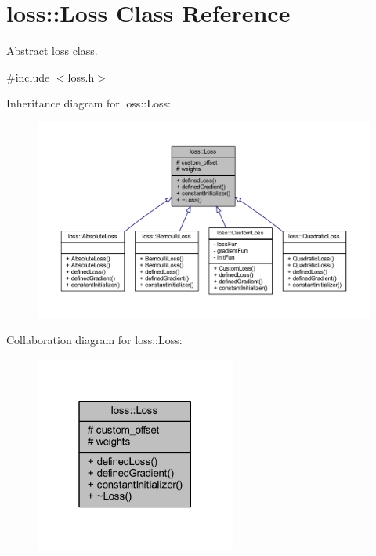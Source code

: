 \hypertarget{classloss_1_1_loss}{}\section{loss\+:\+:Loss Class Reference}
\label{classloss_1_1_loss}


Abstract loss class.  




{\ttfamily \#include $<$loss.\+h$>$}



Inheritance diagram for loss\+:\+:Loss\+:
\nopagebreak
\begin{figure}[H]
\begin{center}
\leavevmode
\includegraphics[width=350pt]{classloss_1_1_loss__inherit__graph}
\end{center}
\end{figure}


Collaboration diagram for loss\+:\+:Loss\+:
\nopagebreak
\begin{figure}[H]
\begin{center}
\leavevmode
\includegraphics[width=187pt]{classloss_1_1_loss__coll__graph}
\end{center}
\end{figure}
